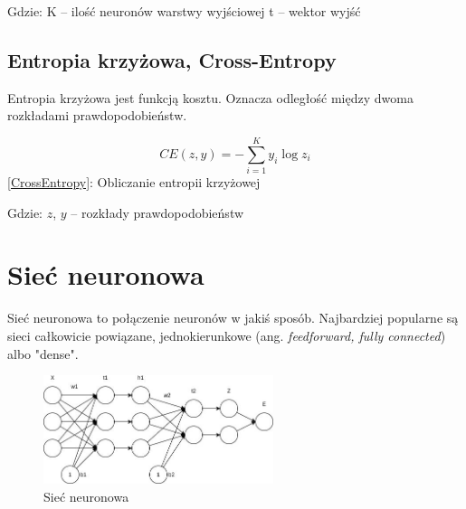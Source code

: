 \documentclass{article}
\begin{document}
\begin{flushleft}
	Gdzie:\newline
	K -- ilość neuronów warstwy wyjściowej\newline
	t -- wektor wyjść
	
\end{flushleft}

\subsection{Entropia krzyżowa, Cross-Entropy}
Entropia krzyżowa jest funkcją kosztu. Oznacza odległość między dwoma rozkładami prawdopodobieństw.

\begin{center}
	\begin{equation}	
		CE(z, y) = -\sum_{i=1}^{K}y_i \log z_i
		\label{CrossEntropy}
	\end{equation}
	\ref{CrossEntropy}: Obliczanie entropii krzyżowej
\end{center} 

\begin{flushleft}
	Gdzie:\newline
	$z$, $y$ -- rozkłady prawdopodobieństw
\end{flushleft}

\section{Sieć neuronowa}
Sieć neuronowa to połączenie neuronów w jakiś sposób. Najbardziej popularne są sieci całkowicie powiązane, jednokierunkowe (ang. \textit{feedforward, fully connected}) albo "dense".

\begin{figure}[H]
	\centering
	\includegraphics[width=0.6\textwidth,keepaspectratio=true]{feed_forward_network}
	\caption{
		Sieć neuronowa  
	}
	\label{feed_forward_network}
\end{figure}
\end{document}
